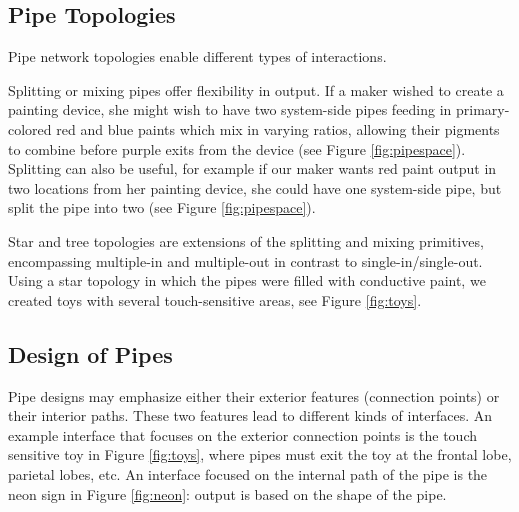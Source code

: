 \subsection{Pipe Topologies}

Pipe network topologies enable different types of interactions.

Splitting or mixing pipes offer flexibility in output.  If a maker wished to create a painting device, she might wish to have two system-side pipes feeding in primary-colored red and blue paints which mix in varying ratios, allowing their pigments to combine before purple exits from the device (see Figure \ref{fig:pipespace}).  Splitting can also be useful, for example if our maker wants red paint output in two locations from her painting device, she could have one system-side pipe, but split the pipe into two (see Figure \ref{fig:pipespace}).

Star and tree topologies are extensions of the splitting and mixing primitives, encompassing multiple-in and multiple-out in contrast to single-in/single-out.  Using a star topology in which the pipes were filled with conductive paint, we created toys with several touch-sensitive areas, see Figure \ref{fig:toys}. 

\subsection{Design of Pipes}

Pipe designs may emphasize either their exterior features (connection points) or their interior paths.  These two features lead to different kinds of interfaces.  An example interface that focuses on the exterior connection points is the touch sensitive toy in Figure \ref{fig:toys}, where pipes must exit the toy at the frontal lobe, parietal lobes, etc.  An interface focused on the internal path of the pipe is the neon sign in Figure \ref{fig:neon}: output is based on the shape of the pipe.
